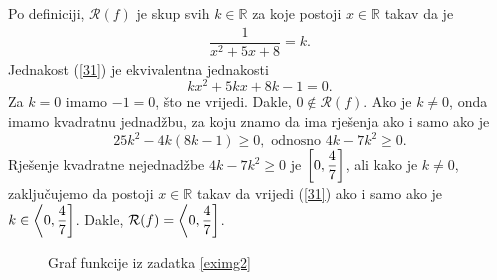 \documentclass{book}
\let\originalleft\left
\let\originalright\right
\renewcommand{\left}{\mathopen{}\mathclose\bgroup\originalleft}
\renewcommand{\right}{\aftergroup\egroup\originalright}
\renewenvironment{proof}{%
    \vspace{-\parskip}\begin{oldproof}%
    }{%
    \end{oldproof}%
}
\theoremstyle{definition}
\theoremstyle{definition}
\theoremstyle{remark}
\begin{document}
\begin{proof}[Rješenje]
Po definiciji, $\mathcal{R}(f)$ je skup svih $k\in \mathbb{R}$ za koje postoji $x\in \mathbb{R}$ takav da je
\begin{gather}
\label{31}
\dfrac{1}{x^2+5x+8}=k.
\end{gather}
Jednakost (\ref{31}) je ekvivalentna jednakosti
$$kx^2+5kx+8k-1=0.$$
Za $k=0$ imamo $-1=0$, što ne vrijedi. Dakle, $0\notin \mathcal{R}(f)$. Ako je $k\neq 0$, onda imamo kvadratnu jednadžbu, za koju znamo da ima rješenja ako i samo ako je
$$25k^2-4k(8k-1)\geq 0,\text{ odnosno } 4k-7k^2\geq 0.$$
Rješenje kvadratne nejednadžbe $4k-7k^2\geq 0$ je $\left[0, \dfrac{4}{7}\right]$, ali kako je $k\neq 0$, zaključujemo da postoji $x\in \mathbb{R}$ takav da vrijedi (\ref{31}) ako i samo ako je $k\in \left\langle 0, \dfrac{4}{7}\right]$. Dakle, $\mathcal{R}(f)=\left\langle 0, \dfrac{4}{7}\right]$.
\begin{figure}[ht]
\begin{center}
\end{center}
\caption{\label{exim2} Graf funkcije iz zadatka \ref{eximg2}}
\end{figure}
\end{proof}
\end{document}

